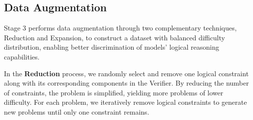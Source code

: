 





    


\label{sec:Data_Aug}
\subsection{Data Augmentation}
Stage 3 performs data augmentation through two complementary techniques, Reduction and Expansion, to construct a dataset with balanced difficulty distribution, enabling better discrimination of models' logical reasoning capabilities.

In the \textbf{Reduction} process, we randomly select and remove one logical constraint along with its corresponding components in the Verifier. By reducing the number of constraints, the problem is simplified, yielding more problems of lower difficulty. For each problem, we iteratively remove logical constraints to generate new problems until only one constraint remains.

